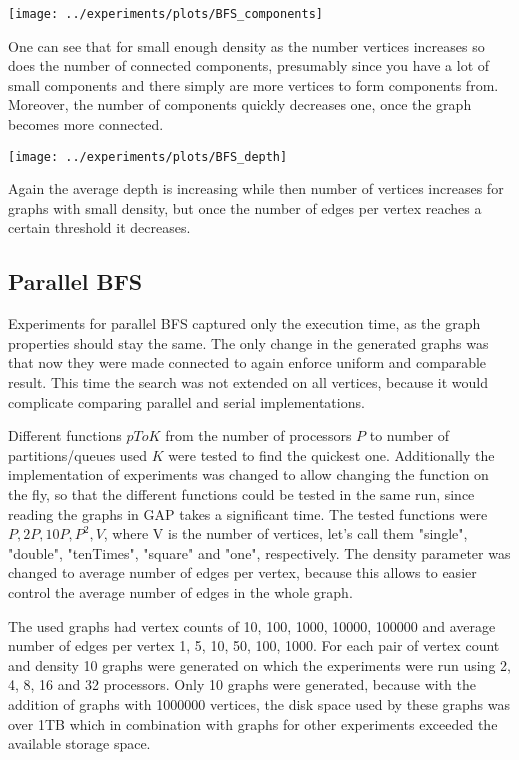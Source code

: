 \documentclass{report}
\theoremstyle{plain}
\theoremstyle{definition}
\theoremstyle{remark}
\begin{document}
\texttt{[image: ../experiments/plots/BFS\_components]}

One can see that for small enough density as the number vertices increases so does the number of connected components, presumably since you have a lot of small components and there simply are more vertices to form components from. Moreover, the number of components quickly decreases one, once the graph becomes more connected. 

\texttt{[image: ../experiments/plots/BFS\_depth]}

Again the average depth is increasing while then number of vertices increases for graphs with small density, but once the number of edges per vertex reaches a certain threshold it decreases.

\subsection{Parallel BFS}

Experiments for parallel BFS captured only the execution time, as the graph properties should stay the same. The only change in the generated graphs was that now they were made connected to again enforce uniform and comparable result. This time the search was not extended on all vertices, because it would complicate comparing parallel and serial implementations. 

Different functions $pToK$ from the number of processors $P$ to number of partitions/queues used $K$ were tested to find the quickest one. Additionally the implementation of experiments was changed to allow changing the function on the fly, so that the different functions could be tested in the same run, since reading the graphs in GAP takes a significant time. The tested functions were $P, 2P, 10P, P^2, V$, where V is the number of vertices, let's call them "single", "double", "tenTimes", "square" and "one", respectively. The density parameter was changed to average number of edges per vertex, because this allows to easier control the average number of edges in the whole graph.

The used graphs had vertex counts of 10, 100, 1000, 10000, 100000 and average number of edges per vertex 1, 5, 10, 50, 100, 1000. For each pair of vertex count and density 10 graphs were generated on which the experiments were run using 2, 4, 8, 16 and 32 processors. Only 10 graphs were generated, because with the addition of graphs with 1000000 vertices, the disk space used by these graphs was over 1TB which in combination with graphs for other experiments exceeded the available storage space.
\end{document}
